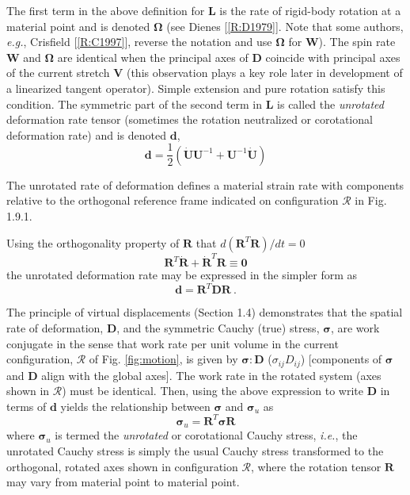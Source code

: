 \documentclass[11pt]{report}
\numberwithin{equation}{section}
\newcommand{\eg}{\emph{e.g.},\xspace}
\newcommand{\ie}{\emph{i.e.},\xspace}
\newcommand{\ti}{\emph}
\newcommand{\nid}{\noindent}
\newcommand{\cauchyu}{\boldsymbol{\sigma}_{u}}
\newcommand{\cauchy}{\boldsymbol{\sigma}}
\newcommand{\region}{\bm{\mathcal{R}}}
\begin{document}
The first term in the above definition for $\mathbf{L}$ is the rate of rigid-body
rotation at a material point and is denoted  $\mathbf{\Omega}$  (see Dienes [\ref{R:D1979}].
Note that some authors, \eg Crisfield [\ref{R:C1997}], reverse the notation
and use  $\mathbf{\Omega}$ for  $\mathbf{W}$).
The spin rate $\mathbf{W}$ and $\mathbf{\Omega}$ are identical when the 
principal axes of $\mathbf{D}$ coincide with principal axes of the current stretch $\mathbf{V}$  
(this observation plays a key role later in development of a linearized tangent operator).
Simple extension and pure rotation satisfy this condition. The symmetric part of the second term 
in $\mathbf{L}$ is called the \ti{unrotated} deformation rate tensor 
(sometimes the rotation neutralized or corotational deformation rate) and is denoted $\mathbf{d}$,
\begin{equation}\label{E:KSSMi}
\mathbf{d} = \frac{1}{2} \left ( \dot {\mathbf{U}}\mathbf{U}^{-1} +  \mathbf{U}^{-1}\dot {\mathbf{U}}\right )
\end{equation}
%

The unrotated rate of deformation defines a material strain rate with components
relative to the 
orthogonal reference frame indicated on configuration $\region$ in Fig. 1.9.1.

Using the orthogonality property of $\mathbf{R}$ that $d(\mathbf{R}^T\mathbf{R})/dt=0$
%
\begin{equation}\label{E:KSSMj}
\mathbf{R}^T\dot {\mathbf{R}} + \dot {\mathbf{R}}^T \mathbf{R}\equiv  \mathbf{0}
\end{equation}
%
\nid the unrotated deformation rate may be expressed in the simpler form as
%
\begin{equation}\label{E:KSSMk}
\mathbf{d} = \mathbf{R}^T \mathbf{D}\mathbf{R}\ .
\end{equation}
%

The principle of virtual displacements (Section 1.4) demonstrates that the 
spatial rate of deformation,  $\mathbf{D}$, and the symmetric Cauchy (true) stress, $\cauchy$, 
are work conjugate in the sense that work rate per unit volume in the current configuration,
$\region$ of Fig. \ref{fig:motion},
is given by $\cauchy:\mathbf{D}$ ($\sigma_{ij}D_{ij}$) [components of  $\cauchy$ and $\mathbf{D}$
align with the global axes]. The work rate in the rotated system (axes shown in $\region$)
must be identical. Then, using the above expression to write $\mathbf{D}$ in terms of $\mathbf{d}$
yields the relationship between $\cauchy$ and $\cauchyu$ as
%
\begin{equation}\label{E:KSSMl}
\cauchyu = \mathbf{R}^T \cauchy \mathbf{R}
\end{equation}
%
\nid where $\cauchyu$ is termed the \ti{unrotated}  or corotational Cauchy stress, \ie
the unrotated Cauchy stress is simply the usual Cauchy stress transformed to the
orthogonal, rotated axes shown in configuration $\region$, where the rotation tensor
$\mathbf{R}$ may vary from material point to material point.
\end{document}
